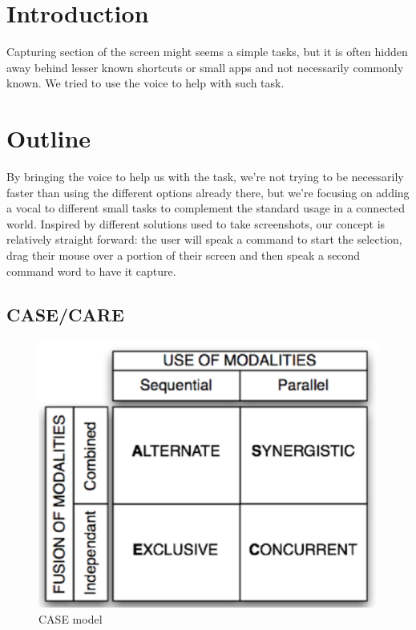 \section{Introduction}

Capturing section of the screen might seems a simple tasks, but it is often hidden away behind lesser known shortcuts or small apps and not necessarily commonly known. We tried to use the voice to help with such task.

\section{Outline}

By bringing the voice to help us with the task, we're not trying to be necessarily faster than using the different options already there, but we're focusing on adding a vocal to different small tasks to complement the standard usage in a connected world.
Inspired by different solutions used to take screenshots, our concept is relatively straight forward: the user will speak a command to start the selection, drag their mouse over a portion of their screen and then speak a second command word to have it capture.

\subsection{CASE/CARE}
\begin{figure}[H]
    \centering
    \includegraphics[scale=.6]{Report/images/CaseCare.png}
    \caption{CASE model}
    \label{fig:my_label}
\end{figure}

